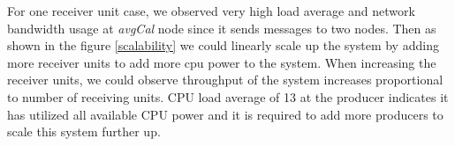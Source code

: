 For one receiver unit case, we observed very high load average and network bandwidth usage at \textit{avgCal} node since it sends messages to two nodes. Then as shown in the figure \ref{scalability} we could linearly scale up the system by adding more receiver units to add more cpu power to the system. When increasing the receiver units, we could observe throughput of the system increases proportional to number of receiving units. CPU load average of 13 at the producer indicates it has utilized all available CPU power and it is required to add more producers to scale this system further up. 


